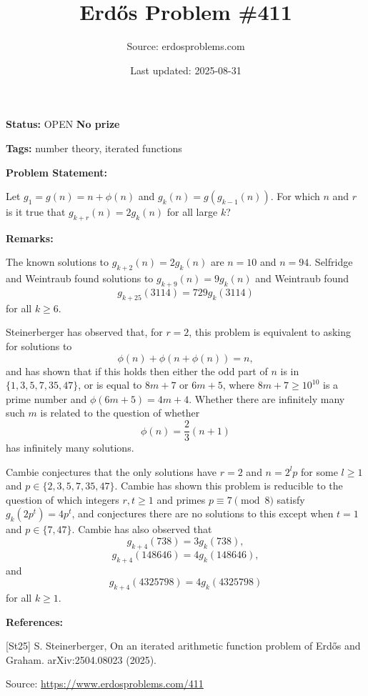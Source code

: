 \documentclass{article}
\title{Erd\H{o}s Problem \#411}
\date{Last updated: 2025-08-31}
\author{Source: erdosproblems.com}
\begin{document}
\maketitle

\noindent\textbf{Status:} OPEN \quad \textbf{No prize}

\noindent\textbf{Tags:} number theory, iterated functions

\medskip
\noindent\textbf{Problem Statement:}

Let $g_1=g(n)=n+\phi(n)$ and $g_k(n)=g(g_{k-1}(n))$. For which $n$ and $r$ is it true that $g_{k+r}(n)=2g_k(n)$ for all large $k$?

\bigskip
\noindent\textbf{Remarks:}

The known solutions to $g_{k+2}(n)=2g_k(n)$ are $n=10$ and $n=94$. Selfridge and Weintraub found solutions to $g_{k+9}(n)=9g_k(n)$ and Weintraub found\[g_{k+25}(3114)=729g_k(3114)\]for all $k\geq 6$.

Steinerberger \cite{St25} has observed that, for $r=2$, this problem is equivalent to asking for solutions to\[\phi(n)+\phi(n+\phi(n))=n,\]and has shown that if this holds then either the odd part of $n$ is in $\{1,3,5,7,35,47\}$, or is equal to $8m+7$ or $6m+5$, where $8m+7\geq 10^{10}$ is a prime number and $\phi(6m+5)=4m+4$. Whether there are infinitely many such $m$ is related to the question of whether\[\phi(n)=\frac{2}{3}(n+1)\]has infinitely many solutions.

Cambie conjectures that the only solutions have $r=2$ and $n=2^lp$ for some $l\geq 1$ and $p\in \{2,3,5,7,35,47\}$. Cambie has shown this problem is reducible to the question of which integers $r,t\geq 1$ and primes $p\equiv 7\pmod{8}$ satisfy $g_k(2p^t)=4p^t$, and conjectures there are no solutions to this except when $t=1$ and $p\in \{7,47\}$. Cambie has also observed that\[g_{k+4}(738)=3g_k(738),\]\[g_{k+4}(148646)=4g_k(148646),\]and\[g_{k+4}(4325798)=4g_{k}(4325798)\]for all $k\geq 1$.

\bigskip
\noindent\textbf{References:}

[St25] S. Steinerberger, On an iterated arithmetic function problem of Erd\H{o}s and Graham. arXiv:2504.08023 (2025).

\bigskip
\noindent\small{Source: \url{https://www.erdosproblems.com/411}}
\end{document}
